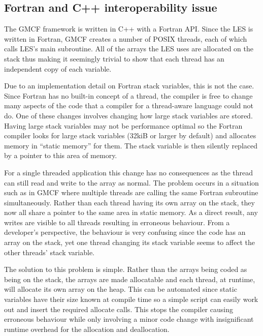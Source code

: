 \subsection{Fortran and C++ interoperability issue}
\label{sec:fortrancppinteroperability}

The GMCF framework is written in C++ with a Fortran API. Since the LES is
written in Fortran, GMCF creates a number of POSIX threads, each of which calls
LES's main subroutine. All of the arrays the LES uses are allocated on the stack
thus making it seemingly trivial to show that each thread has an independent
copy of each variable.

Due to an implementation detail on Fortran stack variables, this is not the
case. Since Fortran has no built-in concept of a thread, the compiler is free to
change many aspects of the code that a compiler for a thread-aware language
could not do. One of these changes involves changing how large stack variables
are stored. Having large stack variables may not be performance optimal so the
Fortran compiler looks for large stack variables (32kiB or larger by default)
and allocates memory in ``static memory'' for them. The stack variable is then
silently replaced by a pointer to this area of memory.

For a single threaded application this change has no consequences as the thread
can still read and write to the array as normal. The problem occurs in a
situation such as in GMCF where multiple threads are calling the same Fortran
subroutine simultaneously. Rather than each thread having its own array on the
stack, they now all share a pointer to the same area in static memory. As a
direct result, any writes are visible to all threads resulting in erroneous
behaviour. From a developer's perspective, the behaviour is very confusing since
the code has an array on the stack, yet one thread changing its stack variable
seems to affect the other threads' stack variable.

The solution to this problem is simple. Rather than the arrays being coded as
being on the stack, the arrays are made allocatable and each thread, at runtime,
will allocate its own array on the heap. This can be automated since static
variables have their size known at compile time so a simple script can easily
work out and insert the required allocate calls. This stops the compiler causing
erroneous behaviour while only involving a minor code change with insignificant
runtime overhead for the allocation and deallocation.
